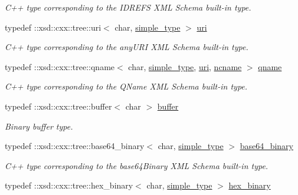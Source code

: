 \begin{DoxyCompactItemize}
\begin{DoxyCompactList}\small\item\em C++ type corresponding to the I\+D\+R\+E\+F\+S X\+M\+L Schema built-\/in type. \end{DoxyCompactList}\item 
typedef \+::xsd\+::cxx\+::tree\+::uri$<$ char, \hyperlink{namespacexml__schema_a44789bb4367951bcf8ae867cb983324d}{simple\+\_\+type} $>$ \hyperlink{namespacexml__schema_a2518fddf119bd258d7443408863ee457}{uri}
\begin{DoxyCompactList}\small\item\em C++ type corresponding to the any\+U\+R\+I X\+M\+L Schema built-\/in type. \end{DoxyCompactList}\item 
typedef \+::xsd\+::cxx\+::tree\+::qname$<$ char, \hyperlink{namespacexml__schema_a44789bb4367951bcf8ae867cb983324d}{simple\+\_\+type}, \hyperlink{namespacexml__schema_a2518fddf119bd258d7443408863ee457}{uri}, \hyperlink{namespacexml__schema_a926a5ddb21b27435d0206310d8fc67b7}{ncname} $>$ \hyperlink{namespacexml__schema_af47d5d85d1b1714be503513b1c09c079}{qname}
\begin{DoxyCompactList}\small\item\em C++ type corresponding to the Q\+Name X\+M\+L Schema built-\/in type. \end{DoxyCompactList}\item 
typedef \+::xsd\+::cxx\+::tree\+::buffer$<$ char $>$ \hyperlink{namespacexml__schema_aff62181c1704f35372302e2acde9b0cc}{buffer}
\begin{DoxyCompactList}\small\item\em Binary buffer type. \end{DoxyCompactList}\item 
typedef \+::xsd\+::cxx\+::tree\+::base64\+\_\+binary$<$ char, \hyperlink{namespacexml__schema_a44789bb4367951bcf8ae867cb983324d}{simple\+\_\+type} $>$ \hyperlink{namespacexml__schema_a4d35d3537187e95237936654b31ba164}{base64\+\_\+binary}
\begin{DoxyCompactList}\small\item\em C++ type corresponding to the base64\+Binary X\+M\+L Schema built-\/in type. \end{DoxyCompactList}\item 
typedef \+::xsd\+::cxx\+::tree\+::hex\+\_\+binary$<$ char, \hyperlink{namespacexml__schema_a44789bb4367951bcf8ae867cb983324d}{simple\+\_\+type} $>$ \hyperlink{namespacexml__schema_a8179ecdc89c60ae524aa6b63ee9d7f77}{hex\+\_\+binary}

\end{DoxyCompactItemize}
